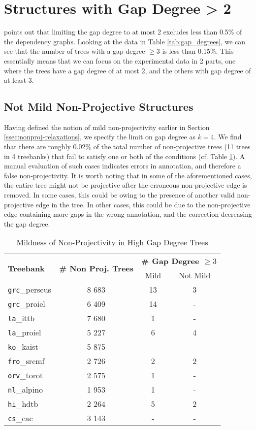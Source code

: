 \section{Structures with Gap Degree > 2}
\label{sec:nonmildnonproj}
 
\cite{nivre2006constraints} points out that limiting the gap degree to at most 2 excludes less than 0.5\% of the dependency graphs. Looking at the data in Table \ref{tab:gap_degrees}, we can see that the number of trees with a gap degree \(\geq 3\) is less than 0.15\%. This essentially means that we can focus on the experimental data in 2 parts, one where the trees have a gap degree of at most 2, and the others with gap degree of at least 3.

\subsection{Not Mild Non-Projective Structures}
Having defined the notion of mild non-projectivity earlier in Section \ref{ssec:nonproj-relaxations}, we specify the limit on gap degree as \(k=4\). We find that there are roughly 0.02\% of the total number of non-projective trees (11 trees in 4 treebanks) that fail to satisfy one or both of the conditions (cf. Table \ref{tab:mildhighgap}). A manual evaluation of such  cases indicates errors in annotation, and therefore a false non-projectivity. It is worth noting that in some of the aforementioned cases, the entire tree might not be projective after the erroneous non-projective edge is removed. In some cases, this could be owing to the presence of another valid non-projective edge in the tree. In other cases, this could be due to the non-projective edge containing more gaps in the wrong annotation, and the correction decreasing the gap degree.

\begin{table}[H]
    \centering
    \begin{tabular}{|l|c|c|c|}
    \hline
    \multirow{2}{*}{\textbf{Treebank}} &
    \multirow{2}{*}{\textbf{\# Non Proj. Trees}} & 
    \multicolumn{2}{c|}{\textbf{\# Gap Degree \(\geq 3\)}} \\
    & & Mild & Not Mild \\
    \hline
    \texttt{grc}\_perseus & 8 683 & 13 & 3 \\
    \texttt{grc}\_proiel & 6 409 & 14 & - \\
    \texttt{la}\_ittb & 7 680 & 1 & - \\
    \texttt{la}\_proiel & 5 227 & 6 & 4 \\
    \texttt{ko}\_kaist & 5 875 & - & - \\
    \texttt{fro}\_srcmf & 2 726 & 2 & 2 \\
    \texttt{orv}\_torot & 2 575 & 1 & - \\
    \texttt{nl}\_alpino & 1 953 & 1 & - \\
    \texttt{hi}\_hdtb & 2 264 & 5 & 2 \\
    \texttt{cs}\_cac & 3 143 & - & - \\
    \hline
    \end{tabular}
    \caption{Mildness of Non-Projectivity in High Gap Degree Trees}
    \label{tab:mildhighgap}
\end{table}


